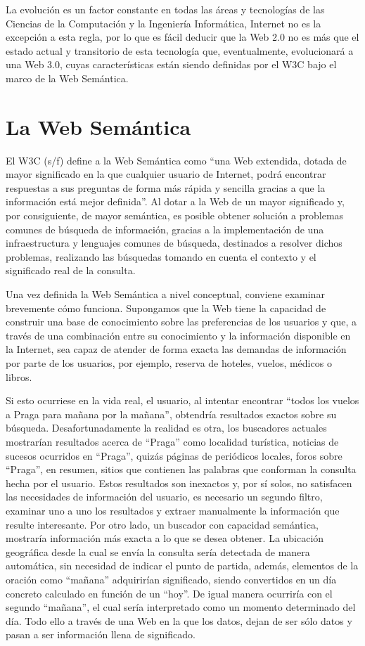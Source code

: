 La evolución es un factor constante en todas las áreas y tecnologías de las Ciencias de la Computación y la Ingeniería Informática, Internet no es la excepción a esta regla, por lo que es fácil deducir que la Web 2.0 no es más que el estado actual y transitorio de esta tecnología que, eventualmente, evolucionará a una Web 3.0, cuyas características están siendo definidas por el W3C bajo el marco de la Web Semántica.

\section{La Web Semántica}

El W3C (s/f) define a la Web Semántica como ``una Web extendida, dotada de mayor significado en la que cualquier usuario de Internet, podrá encontrar respuestas a sus preguntas de forma más rápida y sencilla gracias a que la información está mejor definida''. Al dotar a la Web de un mayor significado y, por consiguiente, de mayor semántica, es posible obtener solución a problemas comunes de búsqueda de información, gracias a la implementación de una infraestructura y lenguajes comunes de búsqueda, destinados a resolver dichos problemas, realizando las búsquedas tomando en cuenta el contexto y el significado real de la consulta.

Una vez definida la Web Semántica a nivel conceptual, conviene examinar brevemente cómo funciona. Supongamos que la Web tiene la capacidad de construir una base de conocimiento sobre las preferencias de los usuarios y que, a través de una combinación entre su conocimiento y la información disponible en la Internet, sea capaz de atender de forma exacta las demandas de información por parte de los usuarios, por ejemplo, reserva de hoteles, vuelos, médicos o libros.

Si esto ocurriese en la vida real, el usuario, al intentar encontrar ``todos los vuelos a Praga para mañana por la mañana'', obtendría resultados exactos sobre su búsqueda. Desafortunadamente la realidad es otra, los buscadores actuales mostrarían resultados acerca de ``Praga'' como localidad turística, noticias de sucesos ocurridos en ``Praga'', quizás páginas de periódicos locales, foros sobre ``Praga'', en resumen, sitios que contienen las palabras que conforman la consulta hecha por el usuario. Estos resultados son inexactos y, por sí solos, no satisfacen las necesidades de información del usuario, es necesario un segundo filtro, examinar uno a uno los resultados y extraer manualmente la información que resulte interesante. Por otro lado, un buscador con capacidad semántica, mostraría información más exacta a lo que se desea obtener. La ubicación geográfica desde la cual se envía la consulta sería detectada de manera automática, sin necesidad de indicar el punto de partida, además, elementos de la oración como ``mañana'' adquirirían significado, siendo convertidos en un día concreto calculado en función de un ``hoy''. De igual manera ocurriría con el segundo ``mañana'', el cual sería interpretado como un momento determinado del día. Todo ello a través de una Web en la que los datos, dejan de ser sólo datos y pasan a ser información llena de significado.

